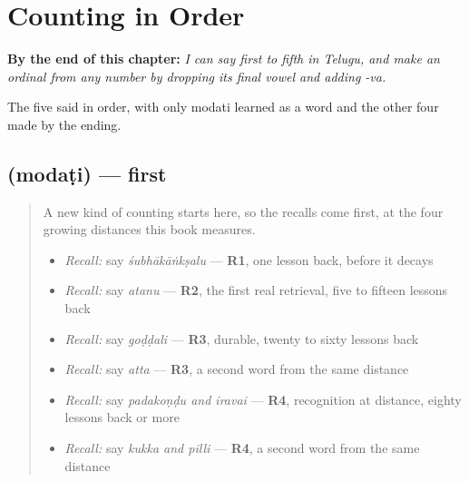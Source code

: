 
\chapter{Counting in Order}
\label{ch:te-ordinals}

\begin{chapteropening}
\textbf{By the end of this chapter:} \emph{I can say first to fifth in Telugu, and make an ordinal from any number by dropping its final vowel and adding -va.}

The five said in order, with only modati learned as a word and the other four made by the ending.
\end{chapteropening}

\section[\texorpdfstring{\te{మొదటి} (modaṭi)}{మొదటి (modaṭi)}]{ (modaṭi) — first}

\label{lesson:TE-C81-first}



\begin{quote}
A new kind of counting starts here, so the recalls come first, at the four growing distances this book measures.

\begin{itemize}
\raggedright
  \item \emph{Recall:} say \emph{śubhākāṅkṣalu} — \textbf{R1}, one lesson back, before it decays
  \item \emph{Recall:} say \emph{atanu} — \textbf{R2}, the first real retrieval, five to fifteen lessons back
  \item \emph{Recall:} say \emph{goḍḍali} — \textbf{R3}, durable, twenty to sixty lessons back
  \item \emph{Recall:} say \emph{atta} — \textbf{R3}, a second word from the same distance
  \item \emph{Recall:} say \emph{padakoṇḍu and iravai} — \textbf{R4}, recognition at distance, eighty lessons back or more
  \item \emph{Recall:} say \emph{kukka and pilli} — \textbf{R4}, a second word from the same distance
\end{itemize}
\end{quote}

